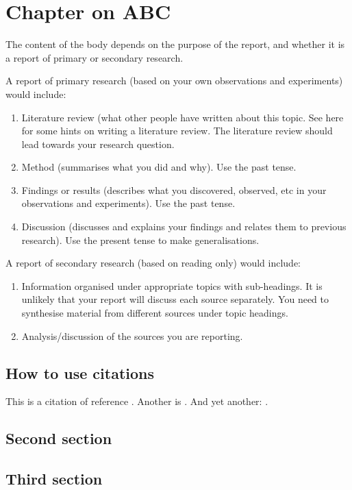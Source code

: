 \chapter{Chapter on ABC}
The content of the body depends on the purpose of the report, and whether it is a report of primary or secondary research.

A report of primary research (based on your own observations and experiments) would include:
\begin{enumerate}
\item
Literature review (what other people have written about this topic. See here for some hints on writing a literature review. The literature review should lead towards your research question.
\item
Method (summarises what you did and why). Use the past tense.
\item
Findings or results (describes what you discovered, observed, etc in your observations and experiments). Use the past tense.
\item
Discussion (discusses and explains your findings and relates them to previous research). Use the present tense to make generalisations.
\end{enumerate}
A report of secondary research (based on reading only) would include:
\begin{enumerate}
\item
Information organised under appropriate topics with sub-headings. It is unlikely that your report will discuss each source separately. You need to synthesise material from different sources under topic headings.
\item
Analysis/discussion of the sources you are reporting.
\end{enumerate}
\section{How to use citations}
This is a citation of reference \parencite{RN4}. Another is \parencite{RN3}. And yet another: \parencite{RN6}. 
\section{Second section}
\section{Third section}